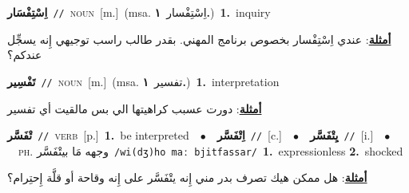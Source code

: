 \documentclass[10pt,a4paper,twoside]{article} %
\begin{document}
\begin{multicols}{2}
{\setlength\topsep{0pt}\textbf{\foreignlanguage{arabic}{اِسْتِفْسَار}}\ {\color{gray}\texttt{//}\color{black}}\ \textsc{noun}\ [m.]\ \color{gray}(msa. \foreignlanguage{arabic}{اِسْتِفْسار}~\foreignlanguage{arabic}{\textbf{١.}})\color{black}\ \textbf{1.}~inquiry\  \begin{flushright}\color{gray}\foreignlanguage{arabic}{\textbf{\underline{\foreignlanguage{arabic}{أمثلة}}}: عندي اِسْتِفْسار بخصوص برنامج المهني. بقدر طالب راسب توجيهي إِنه يسجِّل عندكم؟}\end{flushright}\color{black}} \vspace{2mm}

{\setlength\topsep{0pt}\textbf{\foreignlanguage{arabic}{تَفْسِير}}\ {\color{gray}\texttt{//}\color{black}}\ \textsc{noun}\ [m.]\ \color{gray}(msa. \foreignlanguage{arabic}{تفسير}~\foreignlanguage{arabic}{\textbf{١.}})\color{black}\ \textbf{1.}~interpretation\  \begin{flushright}\color{gray}\foreignlanguage{arabic}{\textbf{\underline{\foreignlanguage{arabic}{أمثلة}}}: دورت عسبب كراهيتها الي بس مالقيت أي تفسير}\end{flushright}\color{black}} \vspace{2mm}

{\setlength\topsep{0pt}\textbf{\foreignlanguage{arabic}{تْفَسَّر}}\ {\color{gray}\texttt{//}\color{black}}\ \textsc{verb}\ [p.]\ \textbf{1.}~be interpreted\ \ $\bullet$\ \ \setlength\topsep{0pt}\textbf{\foreignlanguage{arabic}{اِتْفَسَّر}}\ {\color{gray}\texttt{//}\color{black}}\ [c.]\ \ $\bullet$\ \ \setlength\topsep{0pt}\textbf{\foreignlanguage{arabic}{يِتْفَسَّر}}\ {\color{gray}\texttt{//}\color{black}}\ [i.]\ \ $\bullet$\ \ \textsc{ph.} \color{gray} \foreignlanguage{arabic}{وجهه مَا بيتْفَسَّر}\color{black}\ {\color{gray}\texttt{/{\sffamily wi(dʒ)ho maː bjitfassar}/}\color{black}}\ \textbf{1.}~expressionless  \textbf{2.}~shocked\  \begin{flushright}\color{gray}\foreignlanguage{arabic}{\textbf{\underline{\foreignlanguage{arabic}{أمثلة}}}: هل ممكن هيك تصرف بدر مني إِنه يتْفَسَّر على إِنه وقاحة أو قلَّة إِحتِرام؟}\end{flushright}\color{black}} \vspace{2mm}


\end{multicols}
\end{document}
